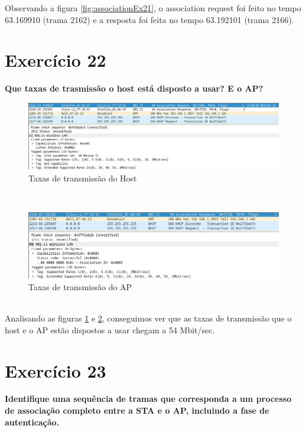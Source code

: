 \documentclass[a4paper]{report}
\begin{document}
Observando a figura \ref{fig:associationEx21}, o association request foi feito 
no tempo 63.169910 (trama 2162) e a resposta foi feita no tempo 63.192101 
(trama 2166).

\section{Exercício 22}
\textbf{Que taxas de trasmissão o host está disposto a usar? E o AP?}\\

\begin{figure}[H]
    \centering 
    \includegraphics[width=\textwidth]{images/hostEx22.png}  
    \caption{Taxas de transmissão do Host}
    \label{fig:hostEx22}
\end{figure}\\

\begin{figure}[H]
    \centering 
    \includegraphics[width=\textwidth]{images/apEx22.png}  
    \caption{Taxas de transmissão do AP}
    \label{fig:apEx22}
\end{figure}\\

Analisando as figuras \ref{fig:hostEx22} e \ref{fig:apEx22}, conseguimos ver que
as taxas de transmissão que o host e o AP estão dispostos a usar chegam a 54 Mbit/sec.

\section{Exercício 23}
\textbf{Identifique uma sequência de tramas que corresponda a um processo de
    associação completo entre a STA e o AP, incluindo a fase de autenticação.}\\
\end{document}
